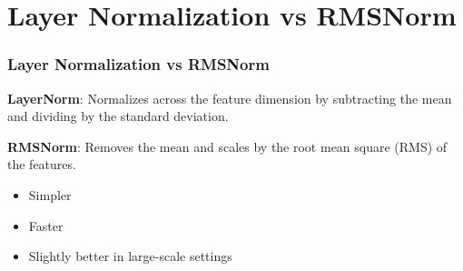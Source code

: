 \section{Layer Normalization vs RMSNorm}
\begin{frame}
    \frametitle{Layer Normalization vs RMSNorm}
    \textbf{LayerNorm}: Normalizes across the feature dimension by subtracting the mean and dividing by the standard deviation.

    \medskip

    \textbf{RMSNorm}: Removes the mean and scales by the root mean square (RMS) of the features.

    \begin{itemize}
        \item Simpler
        \item Faster
        \item Slightly better in large-scale settings \cite{zhou2022rmsnorm}
    \end{itemize}
\end{frame}
